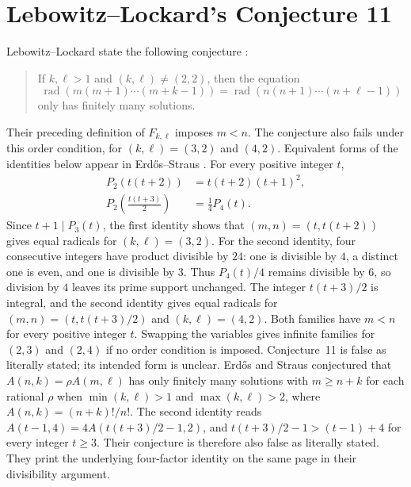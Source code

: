 \section{Lebowitz--Lockard's Conjecture 11}

Lebowitz--Lockard state the following conjecture \cite[Conjecture~11]{LL2025}:
\begin{quote}
If $k,\ell>1$ and $(k,\ell)\ne(2,2)$, then the equation
\[
\operatorname{rad}(m(m+1)\cdots(m+k-1))
=\operatorname{rad}(n(n+1)\cdots(n+\ell-1))
\]
only has finitely many solutions.
\end{quote}
Their preceding definition of $F_{k,\ell}$ imposes $m<n$. The conjecture
also fails under this order condition, for $(k,\ell)=(3,2)$ and $(4,2)$.
Equivalent forms of the identities below appear in Erd\H{o}s--Straus
\cite[p.~64]{ErdosStraus1977}. For every positive integer $t$,
\begin{align*}
P_2(t(t+2))&=t(t+2)(t+1)^2,\\
P_2\!\left(\frac{t(t+3)}2\right)&=\frac14 P_4(t).
\end{align*}
Since $t+1\mid P_3(t)$, the first identity shows that
$(m,n)=(t,t(t+2))$ gives equal radicals for $(k,\ell)=(3,2)$. For the
second identity, four consecutive integers have product divisible by
$24$: one is divisible by $4$, a distinct one is even, and one is divisible
by $3$. Thus $P_4(t)/4$ remains divisible by $6$, so division by $4$ leaves
its prime support unchanged.
The integer $t(t+3)/2$ is integral, and the second identity gives equal
radicals for $(m,n)=(t,t(t+3)/2)$ and $(k,\ell)=(4,2)$. Both families have
$m<n$ for every positive integer $t$. Swapping the variables gives
infinite families for $(2,3)$ and $(2,4)$ if no order condition is imposed.
Conjecture~11 is false as literally stated; its intended form is unclear.
Erd\H{o}s and Straus \cite[p.~64]{ErdosStraus1977} conjectured that
$A(n,k)=\rho A(m,\ell)$ has only finitely many solutions with $m\ge n+k$
for each rational $\rho$ when $\min(k,\ell)>1$ and $\max(k,\ell)>2$,
where $A(n,k)=(n+k)!/n!$. The second identity reads
$A(t-1,4)=4A(t(t+3)/2-1,2)$, and
$t(t+3)/2-1>(t-1)+4$ for every integer $t\ge3$. Their conjecture is
therefore also false as literally stated. They print the underlying
four-factor identity on the same page in their divisibility argument.

